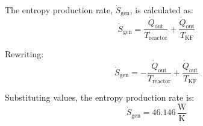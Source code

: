 The entropy production rate, \( \dot{S}_{\text{gen}} \), is calculated as:  
\[
\dot{S}_{\text{gen}} = \frac{\dot{Q}_{\text{out}}}{T_{\text{reactor}}} + \frac{\dot{Q}_{\text{out}}}{T_{\text{KF}}}
\]  

Rewriting:  
\[
\dot{S}_{\text{gen}} = -\frac{\dot{Q}_{\text{out}}}{T_{\text{reactor}}} + \frac{\dot{Q}_{\text{out}}}{T_{\text{KF}}}
\]  

Substituting values, the entropy production rate is:  
\[
\dot{S}_{\text{gen}} = 46.146 \, \frac{\text{W}}{\text{K}}
\]
